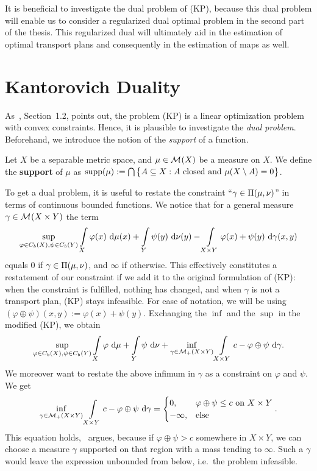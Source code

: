 It is beneficial to investigate the dual problem of (KP), because this dual problem will enable us to consider a regularized dual optimal problem in the second part of the thesis. This regularized dual will ultimately aid in the estimation of optimal transport plans and consequently in the estimation of maps as well.

\section{Kantorovich Duality}\label{KanDual}

As~\cite{San2015}, Section~1.2, points out, the problem (KP) is a linear optimization problem with convex constraints. Hence, it is plausible to investigate the \textit{dual problem}. Beforehand, we introduce the notion of the \textit{support} of a function.

\begin{definition}\label{Supp}
	Let $X$ be a separable metric space, and $\mu \in \M{X}$ be a measure on $X$. We define the \textbf{support} of $\mu$ as $\supp{\mu} := \bigcap \big\{ A \subseteq X : A \text{ closed and } \mu(X \setminus A) = 0 \big\}$.
\end{definition}

To get a dual problem, it is useful to restate the constraint ``$\gamma \in \TP{\mu}{\nu}$'' in terms of continuous bounded functions. We notice that for a general measure $\gamma \in \M{X \times Y}$ the term
\[ \sup\limits_{\varphi \in \CF[b]{X}, \psi \in \CF[b]{Y}} \int\limits_X \varphi(x)~\Dx{\mu} + \int\limits_Y \psi(y)~\Dx[y]{\nu} - \int\limits_{X \times Y} \varphi(x) + \psi(y)~\Dx[x, y]{\gamma} \]
equals $0$ if $\gamma \in \TP{\mu}{\nu}$, and $\infty$ if otherwise. This effectively constitutes a restatement of our constraint if we add it to the original formulation of (KP): when the constraint is fulfilled, nothing has changed, and when $\gamma$ is not a transport plan, (KP) stays infeasible. For ease of notation, we will be using $(\varphi \oplus \psi)(x, y) := \varphi(x) + \psi(y)$. Exchanging the $\inf$ and the $\sup$ in the modified (KP), we obtain
\[ \sup\limits_{\varphi \in \CF[b]{X}, \psi \in \CF[b]{Y}} \int\limits_{X} \varphi~\D + \int\limits_{Y} \psi~\D[\nu] + \inf\limits_{\gamma \in \M[+]{X \times Y}} \int\limits_{X \times Y} c - \varphi \oplus \psi~\D[\gamma]. \]
We moreover want to restate the above infimum in $\gamma$ as a constraint on $\varphi$ and $\psi$. We get
\[ \inf\limits_{\gamma \in \M[+]{X \times Y}} \int\limits_{X \times Y} c - \varphi \oplus \psi~\D[\gamma] = 
\begin{cases}
	0, & \varphi \oplus \psi \le c \text{ on } X \times Y \\
	- \infty, & \text{else}
\end{cases}. \]
This equation holds,\ \cite{San2015} argues, because if $\varphi \oplus \psi > c$ somewhere in $X \times Y$, we can choose a measure $\gamma$ supported on that region with a mass tending to $\infty$. Such a $\gamma$ would leave the expression unbounded from below, i.e.\ the problem infeasible.

